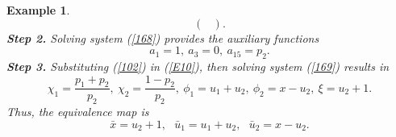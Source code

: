 \documentclass[12pt]{article}
\newtheorem{example}[theorem]{Example}
\begin{document}
\begin{example}
\begin{equation}
\begin{pmatrix}
\end{pmatrix}.
\end{equation}
\textbf{Step 2.} Solving system (\ref{168}) provides the auxiliary functions  
\begin{equation}\label{102}
a_1=1,~ a_3=0,~a_{15}=p_2.
\end{equation}
\textbf{Step 3.} Substituting (\ref{102}) in  (\ref{E10}), then solving system (\ref{169}) results in  
$$\chi_1=\frac{p_1+p_2}{p_2}, ~\chi_2=\frac{1-p_2}{p_2}, ~ \phi_1=u_1+u_2, ~\phi_2=x-u_2,~\xi=u_2+1.$$
 Thus, the equivalence map is
\begin{equation}\label{}
\bar{x}=u_2+1, ~~~\bar{u}_1=u_1+u_2,~~~\bar{u}_2=x-u_2.
\end{equation}
\end{example}

\vspace{0.5cm}
\end{document}

